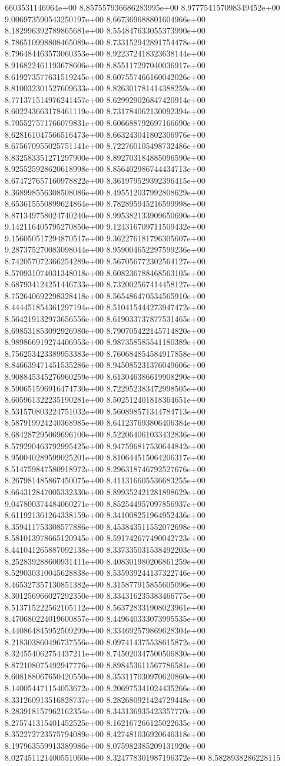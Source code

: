 6603531146964e+00	8.857557936686283995e+00	8.977754157098349452e+00	9.006973590543250197e+00	8.667369688801604966e+00	8.182996392789865681e+00	8.554847633055373990e+00	8.786510998808465089e+00	8.733152942891754478e+00	8.796484463573060353e+00	8.922372418323638144e+00	8.916822461193678606e+00	8.855117297040036917e+00	8.619273577631519245e+00	8.607557466160042026e+00	8.810032301527609633e+00	8.826301781414388259e+00	8.771371514976241457e+00	8.629929026847420914e+00	8.602243663178461119e+00	8.731784062130092394e+00	8.705527571766079831e+00	8.606688792697166690e+00	8.628161047566516473e+00	8.663243041802306976e+00	8.675670955025751141e+00	8.722760105498732486e+00	8.832583351271297900e+00	8.892703184885096590e+00	8.925525928620618998e+00	8.856402986744434713e+00	8.674727657160978822e+00	8.361979529392396415e+00	8.368998556308508086e+00	8.495512037992808629e+00	8.653615550899624864e+00	8.782895945216599998e+00	8.871349758024740240e+00	8.995382133909650690e+00	9.142116405795270850e+00	9.124316709711509432e+00	9.156050517294870517e+00	9.362276181796305607e+00	9.287375270083098044e+00	8.959004652297599236e+00	8.742057072366254289e+00	8.567056772302564127e+00	8.570931074031348018e+00	8.608236788468563105e+00	8.687934124251446733e+00	8.732002567414458127e+00	8.752640692298328418e+00	8.565486470534565910e+00	8.444451854361297194e+00	8.510415444273947472e+00	8.564219132973656556e+00	8.619033737877531465e+00	8.698531853092926980e+00	8.790705422145714820e+00	8.989866919274406953e+00	8.987358585541180389e+00	8.756253423389953383e+00	8.760684854584917858e+00	8.846639471451535286e+00	8.945085231376049606e+00	8.908845345276960259e+00	8.613046386619908290e+00	8.590651596916474730e+00	8.722952383472998505e+00	8.605961322235190281e+00	8.502512401818364651e+00	8.531570803224751032e+00	8.560898571344784713e+00	8.587919924240368985e+00	8.641237693806406384e+00	8.684287295069696100e+00	8.522064061033432836e+00	8.579290463792995425e+00	8.947596817530644842e+00	8.950040289599025201e+00	8.810644515064206317e+00	8.514759847580918972e+00	8.296318746792527676e+00	8.267981485867450075e+00	8.411316605536683255e+00	8.664312847005332330e+00	8.899352421281898629e+00	9.047800374484060271e+00	8.852544957097856937e+00	8.611921361264338159e+00	8.341008251964952436e+00	8.359411753308577886e+00	8.453843511552072698e+00	8.581013978665120945e+00	8.591742677490042723e+00	8.441041265887092138e+00	8.337335031538492203e+00	8.252839288600931411e+00	8.408301980206861259e+00	8.529030310045628838e+00	8.535939244137322746e+00	8.465327357130851382e+00	8.315877915855605096e+00	8.301256966027292350e+00	8.334316235383466775e+00	8.513715222562105112e+00	8.563728331908023961e+00	8.470680224019600857e+00	8.449640333073995535e+00	8.440864845952509299e+00	8.334692579869628304e+00	8.218303860496737556e+00	8.097414375538615872e+00	8.324554062754437211e+00	8.745020347500506830e+00	8.872108075492947776e+00	8.898453611567786581e+00	8.608188067650420550e+00	8.353117030970620860e+00	8.140054471154053672e+00	8.206975341024435266e+00	8.331260913516828737e+00	8.282680921424729448e+00	8.283918157962162354e+00	8.343136935423357770e+00	8.275741315401452525e+00	8.162167266125022635e+00	8.352272723575794089e+00	8.427481036920646318e+00	8.197963559913389986e+00	8.075982385209131920e+00	8.027451121400551060e+00	8.324778301987196372e+00	8.5828938286228115